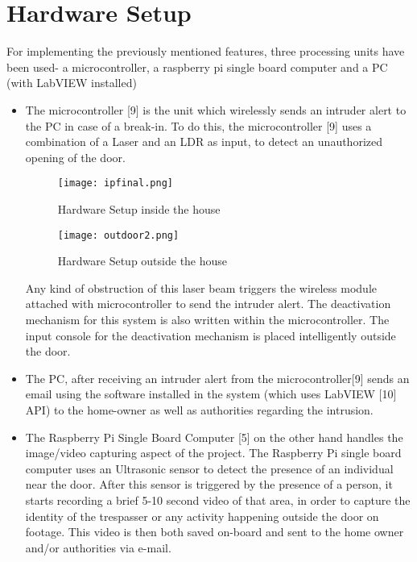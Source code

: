 \documentclass[letterpaper, 10 pt, conference]{ieeeconf}
\begin{document}
\section{Hardware Setup}

For implementing the previously mentioned features, three processing units have been used- a microcontroller, a raspberry pi single board computer and a PC (with LabVIEW installed)

\begin{itemize}

\item The microcontroller [9] is the unit which wirelessly sends an intruder alert to the PC in case of a break-in. To do this, the microcontroller [9] uses a combination of a Laser and an LDR as input, to detect an unauthorized opening of the door.

\begin{figure}[h!]
\centering
\texttt{[image: ipfinal.png]}
\caption{\label{fig:ipfinal}Hardware Setup inside the house}
\end{figure}

\begin{figure}[h!]
\centering
\texttt{[image: outdoor2.png]}
\caption{\label{fig:outdoor2}Hardware Setup outside the house}
\end{figure}




Any kind of obstruction of this laser beam triggers the wireless module attached with microcontroller to send the intruder alert. The deactivation mechanism for this system is also written within the microcontroller. The input console for the deactivation mechanism is placed intelligently outside the door.   
\item The PC, after receiving an intruder alert from the microcontroller[9] sends an email using the software installed in the system (which uses LabVIEW [10] API) to the home-owner as well as authorities regarding the intrusion. 
\item The Raspberry Pi Single Board Computer [5] on the other hand handles the image/video capturing aspect of the project. The Raspberry Pi single board computer uses an Ultrasonic sensor to detect the presence of an individual near the door. After this sensor is triggered by the presence of a person, it starts recording a brief 5-10 second video of that area, in order to capture the identity of the trespasser or any activity happening outside the door on footage. This video is then both saved on-board and sent to the home owner and/or authorities via e-mail. 
\end{itemize}
\end{document}
